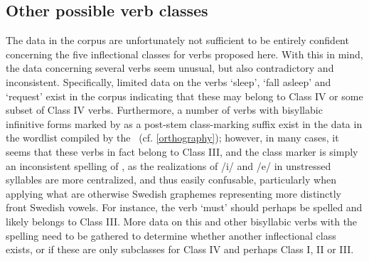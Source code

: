 \subsection{Other possible verb classes}\label{otherVerbClasses}
The data in the corpus are unfortunately not sufficient to be entirely confident concerning the five inflectional classes for verbs proposed here. With this in mind, the data concerning several verbs seem unusual, but also contradictory and inconsistent. Specifically, limited data on the verbs  ‘sleep’,  ‘fall asleep’  %
and  ‘request’ %
exist in the corpus indicating that these may belong to Class IV or some subset of Class IV verbs. Furthermore, a number of verbs with bisyllabic infinitive forms marked by  as a post-stem class-marking suffix exist in the data in the wordlist compiled by the \WLP\ (cf. \SEC\ref{orthography}); however, in many cases, it seems that these verbs in fact belong to Class III, and the  class marker is simply an inconsistent spelling of , as the realizations of /i/ and /e/ in unstressed syllables are more centralized, and thus easily confusable, particularly when applying what are otherwise Swedish graphemes representing more distinctly front Swedish vowels. For instance, the verb  ‘must’ should perhaps be spelled  and likely belongs to Class III. More data on this and other bisyllabic verbs with the  spelling need to be gathered to determine whether another inflectional class exists, or if these are only subclasses for Class IV and perhaps Class I, II or III. 



